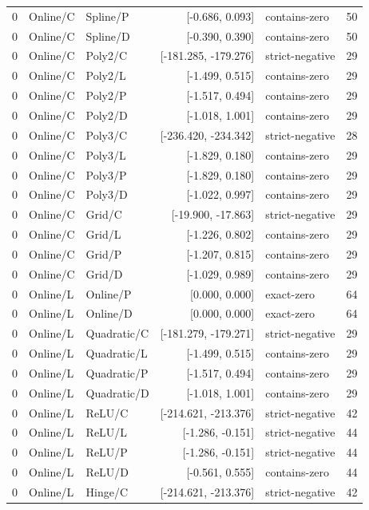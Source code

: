 \begin{longtable}{lllrlr}
0 & Online/C & Spline/P & [-0.686, 0.093] & contains-zero & 50 \\
0 & Online/C & Spline/D & [-0.390, 0.390] & contains-zero & 50 \\
0 & Online/C & Poly2/C & [-181.285, -179.276] & strict-negative & 29 \\
0 & Online/C & Poly2/L & [-1.499, 0.515] & contains-zero & 29 \\
0 & Online/C & Poly2/P & [-1.517, 0.494] & contains-zero & 29 \\
0 & Online/C & Poly2/D & [-1.018, 1.001] & contains-zero & 29 \\
0 & Online/C & Poly3/C & [-236.420, -234.342] & strict-negative & 28 \\
0 & Online/C & Poly3/L & [-1.829, 0.180] & contains-zero & 29 \\
0 & Online/C & Poly3/P & [-1.829, 0.180] & contains-zero & 29 \\
0 & Online/C & Poly3/D & [-1.022, 0.997] & contains-zero & 29 \\
0 & Online/C & Grid/C & [-19.900, -17.863] & strict-negative & 29 \\
0 & Online/C & Grid/L & [-1.226, 0.802] & contains-zero & 29 \\
0 & Online/C & Grid/P & [-1.207, 0.815] & contains-zero & 29 \\
0 & Online/C & Grid/D & [-1.029, 0.989] & contains-zero & 29 \\
0 & Online/L & Online/P & [0.000, 0.000] & exact-zero & 64 \\
0 & Online/L & Online/D & [0.000, 0.000] & exact-zero & 64 \\
0 & Online/L & Quadratic/C & [-181.279, -179.271] & strict-negative & 29 \\
0 & Online/L & Quadratic/L & [-1.499, 0.515] & contains-zero & 29 \\
0 & Online/L & Quadratic/P & [-1.517, 0.494] & contains-zero & 29 \\
0 & Online/L & Quadratic/D & [-1.018, 1.001] & contains-zero & 29 \\
0 & Online/L & ReLU/C & [-214.621, -213.376] & strict-negative & 42 \\
0 & Online/L & ReLU/L & [-1.286, -0.151] & strict-negative & 44 \\
0 & Online/L & ReLU/P & [-1.286, -0.151] & strict-negative & 44 \\
0 & Online/L & ReLU/D & [-0.561, 0.555] & contains-zero & 44 \\
0 & Online/L & Hinge/C & [-214.621, -213.376] & strict-negative & 42 \\

\end{longtable}
